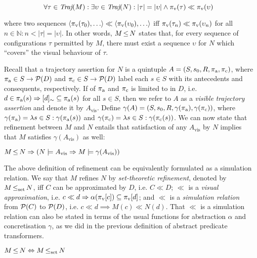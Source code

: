 \begin{equation*}
\forall \tau \in \operatorname{\textit{Traj}}(M) : \exists \upsilon \in \operatorname{\textit{Traj}}(N) : | \tau | = | \upsilon | \wedge \pi_{\textrm{v}}(\tau) \ll \pi_{\textrm{v}}(\upsilon)
\end{equation*}

\noindent where two sequences $\langle \pi_{\textrm{v}}(\tau_{0}), \ldots \rangle \ll \langle \pi_{\textrm{v}}(\upsilon_{0}), \ldots \rangle$ iff $\pi_{\textrm{v}}(\tau_{n}) \ll \pi_{\textrm{v}}(\upsilon_{n})$ for all $n \in \mathbb{N} : n < | \tau | = | \upsilon |$. In other words, $M \operatorname{\leq} N$ states that, for every sequence of configurations $\tau$ permitted by $M$, there must exist a sequence $\upsilon$ for $N$ which ``covers'' the visual behaviour of $\tau$.

Recall that a trajectory assertion for $N$ is a quintuple $A = (S, s_{0}, R, \operatorname{\pi_{\textrm{a}}}, \operatorname{\pi_{\textrm{c}}})$, where $\operatorname{\pi_{\textrm{a}}} \in S \rightarrow \mathcal{P}(D)$ and $\operatorname{\pi_{\textrm{c}}} \in S \rightarrow \mathcal{P}(D)$ label each $s \in S$ with its antecedents and consequents, respectively. If \todo{\dots} of $\operatorname{\pi_{\textrm{a}}}$ and $\operatorname{\pi_{\textrm{c}}}$ is limited to \todo{\dots} in $D$, i.e. $d \in \operatorname{\pi_{\textrm{a}}}(s) \Rightarrow [d]_{\sim} \subseteq \operatorname{\pi_{\textrm{a}}}(s)$ for all $s \in S$, then we refer to $A$ as a \textit{visible trajectory assertion} and denote it by $A_{\textrm{vis}}$. Define $\gamma(A) = (S, s_{0}, R, \gamma(\operatorname{\pi_{\textrm{a}}}), \gamma(\operatorname{\pi_{\textrm{c}}}))$, where $\gamma(\operatorname{\pi_{\textrm{a}}}) = \lambda s \in S : \gamma(\operatorname{\pi_{\textrm{a}}}(s))$ and $\gamma(\operatorname{\pi_{\textrm{c}}}) = \lambda s \in S : \gamma(\operatorname{\pi_{\textrm{c}}}(s))$. We can now state that refinement between $M$ and $N$ entails that satisfaction of any $A_{\textrm{vis}}$ by $N$ implies that $M$ satisfies $\gamma(A_{\textrm{vis}})$ as well:

\begin{theorem} \label{thm:traj-refines}
$M \operatorname{\leq} N \Rightarrow (N \models A_{\textrm{vis}} \Rightarrow M \models \gamma(A_{\textrm{vis}}))$
\end{theorem}

The above definition of refinement can be equivalently formulated as a simulation relation. We say that $M$ refines $N$ by \textit{set-theoretic refinement}, denoted by $M \operatorname{\operatorname{\leq}_{\textrm{set}}} N$, iff $C$ can be approximated by $D$, i.e. $C \ll D$; $\ll$ is a \textit{visual approximation}, i.e. $c \ll d \Rightarrow \alpha(\pi_{\textrm{v}}[c]) \subseteq \pi_{\textrm{v}}[d]$; and $\ll$ is a \textit{simulation relation} from $\mathcal{P}(C)$ to $\mathcal{P}(D)$, i.e. $c \ll d \implies M(c) \ll N(d)$. That $\ll$ is a simulation relation can also be stated in terms of the usual functions for abstraction $\alpha$ and concretisation $\gamma$, as we did in the previous definition of abstract predicate transformers.

\begin{theorem} \label{thm:traj-equal-set}
$M \operatorname{\leq} N \Leftrightarrow M \operatorname{\operatorname{\leq}_{\textrm{set}}} N$
\end{theorem}
